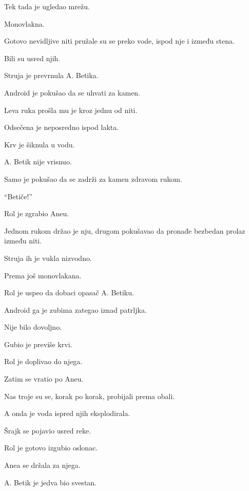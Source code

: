 Tek tada je ugledao mrežu.

Monovlakna.

Gotovo nevidljive niti pružale su se preko vode, ispod nje i između stena.

\bigskip

Bili su usred njih.

\bigskip

Struja je prevrnula A. Betika.

Android je pokušao da se uhvati za kamen.

Leva ruka prošla mu je kroz jednu od niti.

\bigskip

Odsečena je neposredno ispod lakta.

\bigskip

Krv je šiknula u vodu.

A. Betik nije vrisnuo.

Samo je pokušao da se zadrži za kamen zdravom rukom.

\bigskip

``Betiče!''

\bigskip

Rol je zgrabio Aneu.

Jednom rukom držao je nju, drugom pokušavao da pronađe bezbedan prolaz između niti.

Struja ih je vukla nizvodno.

Prema još monovlakana.

\bigskip

Rol je uspeo da dobaci opasač A. Betiku.

Android ga je zubima zategao iznad patrljka.

Nije bilo dovoljno.

Gubio je previše krvi.

\bigskip

Rol je doplivao do njega.

Zatim se vratio po Aneu.

Nas troje su se, korak po korak, probijali prema obali.

\bigskip

A onda je voda ispred njih eksplodirala.

\bigskip

Šrajk se pojavio usred reke.

\bigskip

Rol je gotovo izgubio oslonac.

Anea se držala za njega.

A. Betik je jedva bio svestan.

